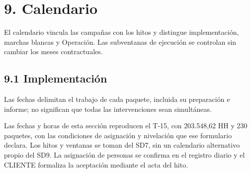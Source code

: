 \section*{9. Calendario}

El calendario vincula las campañas con los hitos y distingue implementación, marchas blancas y Operación. Las subventanas de ejecución se controlan sin cambiar los meses contractuales.

\subsection*{9.1 Implementación}

Las fechas delimitan el trabajo de cada paquete, incluida su preparación e informe; no significan que todas las intervenciones sean simultáneas.

Las fechas y horas de esta sección reproducen el T-15, con 203.548,62 HH y 230 paquetes, con las condiciones de asignación y nivelación que ese formulario declara. Los hitos y ventanas se toman del SD7, sin un calendario alternativo propio del SD9. La asignación de personas se confirma en el registro diario y el CLIENTE formaliza la aceptación mediante el acta del hito.

